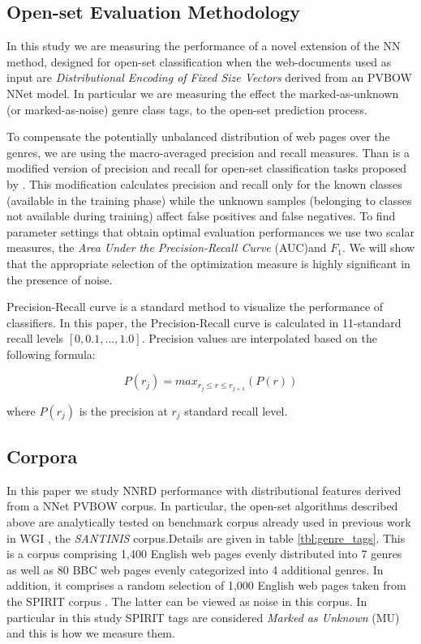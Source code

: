 \documentclass[runningheads]{llncs}
\begin{document}
\subsection{Open-set Evaluation Methodology}
In this study we are measuring the performance of a novel extension of the NN method, designed for open-set classification when the web-documents used as input are \textit{Distributional Encoding of Fixed Size Vectors} derived from an PVBOW NNet model. In particular we are measuring the effect the marked-as-unknown (or marked-as-noise) genre class tags, to the open-set prediction process.

To compensate the potentially unbalanced distribution of web pages over the genres, we are using the macro-averaged precision and recall measures. Than is a modified version of precision and recall for open-set classification tasks proposed by \cite{mendesjunior2016}. This modification calculates precision and recall only for the known classes (available in the training phase) while the unknown samples (belonging to classes not available during training) affect false positives and false negatives. To find parameter settings that obtain optimal evaluation performances we use two scalar measures, the \textit{Area Under the Precision-Recall Curve} (AUC)and $F_{1}$. We will show that the appropriate selection of the optimization measure is highly significant in the presence of noise.

Precision-Recall curve is a standard method to visualize the performance of classifiers. In this paper, the Precision-Recall curve is calculated in 11-standard recall levels $[0,0.1,...,1.0]$. Precision values are interpolated based on the following formula:

\begin{equation}
	P(r_j)=max_{r_j \leqslant r \leqslant r_{j+1}}(P(r))
\end{equation}

\noindent
where $P(r_j)$ is the precision at $r_j$ standard recall level.

\subsection{Corpora}\label{sec:corpora}
In this paper we study NNRD performance with distributional features derived from a NNet PVBOW corpus. In particular, the open-set algorithms described above are analytically tested on benchmark corpus already used in previous work in WGI \citep{meyer2004genre,santini2007automatic,kanaris2009learning,pritsos2018open}, the \textit{SANTINIS} \cite{mehler2010genres_on_web} corpus.Details are given in table \ref{tbl:genre_tags}. This is a corpus comprising 1,400 English web pages evenly distributed into 7 genres as well as 80 BBC web pages evenly categorized into 4 additional genres. In addition, it comprises a random selection of 1,000 English web pages taken from the SPIRIT corpus \cite{joho2004spirit}. The latter can be viewed as noise in this corpus. In particular in this study SPIRIT tags are considered \textit{Marked as Unknown} (MU) and this is how we measure them.
\end{document}
